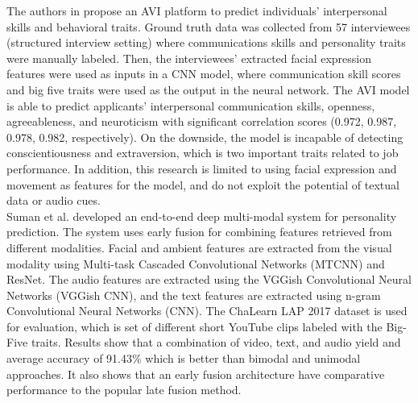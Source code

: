 The authors in \cite{video-interview3-suen2020intelligent} propose an AVI platform to predict individuals' interpersonal skills and behavioral traits. Ground truth data was collected from 57 interviewees (structured interview setting) where communications skills and personality traits were manually labeled. Then, the interviewees’ extracted facial expression features were used as inputs in a CNN model, where communication skill scores and big five traits were used as the output in the neural network. The AVI model is able to predict applicants' interpersonal communication skills, openness, agreeableness, and neuroticism with significant correlation scores (0.972, 0.987, 0.978, 0.982, respectively). On the downside, the model is incapable of detecting conscientiousness and extraversion, which is two important traits related to job performance. In addition, this research is limited to using facial expression and movement as features for the model, and do not exploit the potential of textual data or audio cues. \\

Suman et al. \cite{video-interview4-SUMAN2022107715} developed an end-to-end deep multi-modal system for personality prediction. The system uses early fusion for combining features retrieved from different modalities. Facial and ambient features are extracted from the visual modality using Multi-task Cascaded Convolutional Networks (MTCNN) and ResNet. The audio features are extracted using the VGGish Convolutional Neural Networks (VGGish CNN), and the text features are extracted using n-gram Convolutional Neural Networks (CNN). The ChaLearn LAP 2017 dataset is used for evaluation, which is set of different short YouTube clips labeled with the Big-Five traits. Results show that a combination of video, text, and audio yield and average accuracy of 91.43\% which is better than bimodal and unimodal approaches. It also shows that an early fusion architecture have comparative performance to the popular late fusion method.  \\ 







